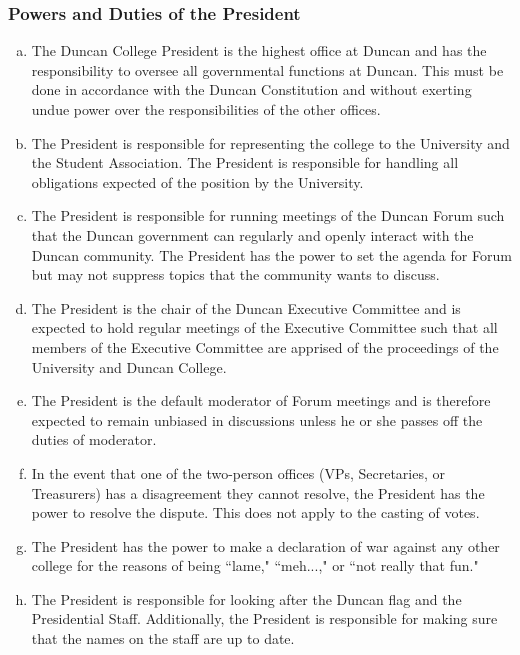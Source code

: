 \documentclass[USletter,12pt]{article}
\begin{document}
\subsubsection{Powers and Duties of the President}
\begin{enumerate}[(a)]
\item The Duncan College President is the highest office at Duncan and has the responsibility to oversee all governmental functions at Duncan.  This must be done in accordance with the Duncan Constitution and without exerting undue power over the responsibilities of the other offices.
\item The President is responsible for representing the college to the University and the Student Association. The President is responsible for handling all obligations expected of the position by the University.  
\item The President is responsible for running meetings of the Duncan Forum such that the Duncan government can regularly and openly interact with the Duncan community.  The President has the power to set the agenda for Forum but may not suppress topics that the community wants to discuss.
\item The President is the chair of the Duncan Executive Committee and is expected to hold regular meetings of the Executive Committee such that all members of the Executive Committee are apprised of the proceedings of the University and Duncan College.
\item The President is the default moderator of Forum meetings and is therefore expected to remain unbiased in discussions unless he or she passes off the duties of moderator.
\item In the event that one of the two-person offices (VPs, Secretaries, or Treasurers) has a disagreement they cannot resolve, the President has the power to resolve the dispute.  This does not apply to the casting of votes.
\item The President has the power to make a declaration of war against any other college for the reasons of being ``lame," ``meh...," or ``not really that fun."
\item The President is responsible for looking after the Duncan flag and the Presidential Staff.  Additionally, the President is responsible for making sure that the names on the staff are up to date.
\end{enumerate}
\end{document}
